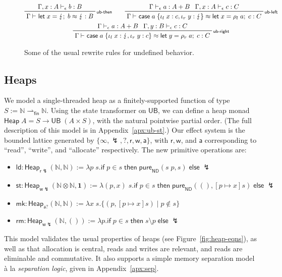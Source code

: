 \documentclass[acmsmall,screen,review]{acmart}
\newcommand{\mb}[1]{\ensuremath{\mathbf{#1}}}
\newcommand{\ms}[1]{\ensuremath{\mathsf{#1}}}
\newcommand{\nats}{\mathbb{N}}
\newcommand{\lto}{:}
\newcommand{\linl}[1]{\iota_l\;{#1}}
\newcommand{\linr}[1]{\iota_r\;{#1}}
\newcommand{\letexpr}[3]{\ensuremath{\ms{let}\;#1 = #2;\;#3}}
\newcommand{\caseexpr}[5]{\ms{case}\;#1\;\{\linl{#2} \lto #3, \linr{#4} \lto #5\}}
\newcommand{\rle}[1]{{\scriptsize\textsf{#1}}}
\newcommand{\hasty}[4]{#1 \vdash_{#2} #3: {#4}}
\newcommand{\teqv}{\approx}
\newcommand{\tmeq}[5]{#1 \vdash_{#2} #3 \teqv #4 : {#5}}
\newcommand{\pto}{\rightharpoonup}
\newcommand{\fpto}{\pto_{\ms{fin}}}
\newcommand{\ubeff}{\lightning}
\begin{document}
\begin{figure}
  \begin{adjustbox}{minipage=1.1\textwidth,scale=0.9}
  \begin{gather*}
    \prftree[r]{\rle{ub-then}}
      {\hasty{\Gamma, x : A}{\epsilon}{b}{B}}
      {\tmeq{\Gamma}{}{\letexpr{x}{\ubeff}{b}}{\ubeff}{B}} \qquad
    \prftree[r]{\rle{ub-left}}
      {\hasty{\Gamma}{\epsilon}{a}{A + B}}
      {\hasty{\Gamma, x : A}{\epsilon}{c}{C}}
      {\tmeq{\Gamma}{}{\caseexpr{a}{x}{c}{y}{\ubeff}}{\letexpr{x}{\rho_l\;a}{c}}{C}}
    \\
    \prftree[r]{\rle{ub-right}}
      {\hasty{\Gamma}{\epsilon}{a}{A + B}}
      {\hasty{\Gamma, y : B}{\epsilon}{c}{C}}
      {\tmeq{\Gamma}{}{\caseexpr{a}{x}{\ubeff}{y}{c}}{\letexpr{y}{\rho_r\;a}{c}}{C}}
  \end{gather*}
  \end{adjustbox}
  \caption{
    Some of the usual rewrite rules for undefined behavior.
  }
  \Description{}
  \label{fig:ub-rewrites}
\end{figure}

\subsection{Heaps}

We model a single-threaded heap
as a finitely-supported function of type $S := \nats \fpto \nats$. Using the state transformer on
 $\ms{UB}$, we can define a heap monad 
$\ms{Heap}\;A = S \to \ms{UB}\;(A \times S)$, with the natural pointwise partial order.
(The full description of this model is in Appendix~\ref{apx:ub-st}.)
% 
Our effect system is the bounded lattice generated by 
$\{\infty, \ubeff, ?, \ms{r}, \ms{w}, \ms{a}\}$, with $\ms{r}, \ms{w}$, and $\ms{a}$ corresponding to 
``read'', ``write'', and ``allocate'' respectively. The new primitive operations are:
\begin{itemize}
  \item $\ms{ld} : \ms{Heap}_{\ms{r}\ubeff}(\nats, \nats) := 
    \lambda p\; s.
      \ms{if}\;p \in s\;\ms{then}\;\ms{pure}_{\ms{ND}}(s\;p, s)\;\ms{else}\;\ubeff
    $
  \item $\ms{st} : \ms{Heap}_{\ms{w}\ubeff}(\nats \otimes \nats, \mb{1}) :=
    \lambda (p, x)\; s.
      \ms{if}\;p \in s\;\ms{then}\;\ms{pure}_{\ms{ND}}((), [p \mapsto x]s)\;\ms{else}\;\ubeff
    $
  \item $\ms{mk} : \ms{Heap}_{\ms{a}?}(\nats, \nats) :=
    \lambda x\; s. \{(p, [p \mapsto x]s) \mid p \notin s\}
    $
  \item $\ms{rm} : \ms{Heap}_{\ms{w}\ubeff}(\nats, ()) :=
    \lambda p . \ms{if}\;p \in s\;\ms{then}\;s \setminus p\;\ms{else}\;\ubeff
    $
\end{itemize}
This model validates the usual properties of heaps (see Figure~\ref{fig:heap-eqns}), as well as
that allocation is central, reads and writes are relevant, and reads are eliminable and commutative.
%
It also supports a simple memory separation model 
à la \emph{separation logic}, given in Appendix~\ref{apx:sep}.
\end{document}
